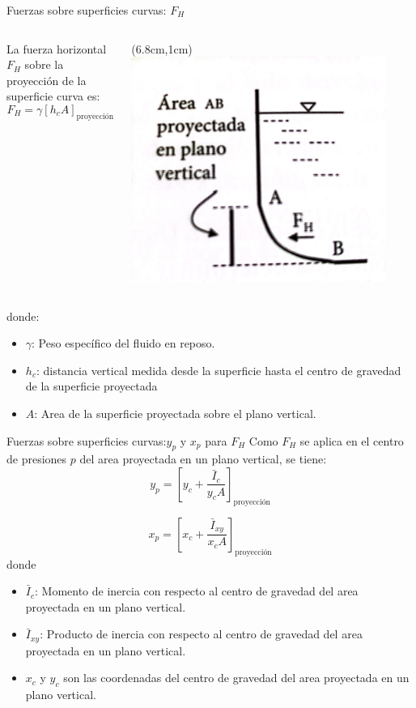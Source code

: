 \documentclass [xcolor=svgnames, t] {beamer}
\begin{document}
\begin{frame}{Fuerzas sobre superficies curvas: $F_H$}
\begin{columns}
La fuerza horizontal $F_H$ sobre la proyecci\'on de la superficie curva es:
$$
F_H=\gamma[h_c A]_{\text{proyecci\'on}} 
$$
\begin{textblock*}{6cm}(6.8cm,1cm) %
\includegraphics[width=0.9\textwidth]{curb3}
\end{textblock*}
\end{columns}
\vspace{1.5cm}
donde:
\begin{itemize} 
\item $\gamma$: Peso espec\'ifico del fluido en reposo.
\item $h_c$: distancia vertical medida desde la superficie hasta el centro de gravedad de la superficie proyectada
\item $A$: Area de la superficie proyectada sobre el plano vertical.
\end{itemize}
\end{frame}

\begin{frame}{Fuerzas sobre superficies curvas:$y_p$ y $x_p$ para $F_H$}
Como $F_H$ se aplica en el centro de presiones $p$ del area proyectada en un plano vertical, se tiene:
$$
y_p = \left[ y_c + \frac{\bar{I}_c}{y_c A} \right]_{\text{proyecci\'on}}
$$

$$
x_p = \left[ x_c + \frac{\bar{I}_{xy}}{x_c A} \right]_{\text{proyecci\'on}}
$$
donde
\begin{itemize}
\item $\bar{I}_c$: Momento de inercia con respecto al centro de gravedad del area proyectada en un plano vertical.
\item $\bar{I}_{xy}$: Producto de inercia con respecto al centro de gravedad del area proyectada en un plano vertical.
\item $x_c$ y $y_c$ son las coordenadas del centro de gravedad del area proyectada en un plano vertical.
\end{itemize}
\end{frame}
\end{document}
